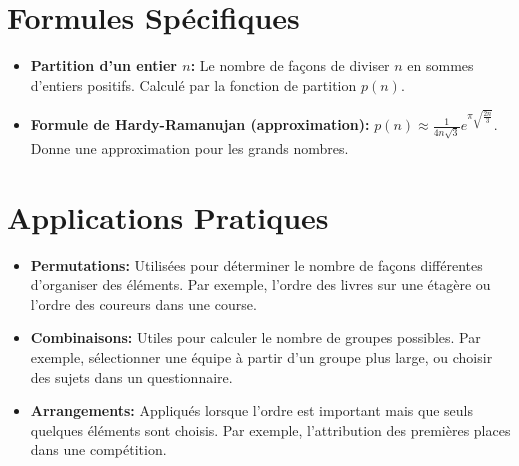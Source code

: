 \documentclass{article}
\begin{document}
\section{Formules Spécifiques}
\begin{itemize}
    \item \textbf{Partition d'un entier \(n\):} Le nombre de façons de diviser \(n\) en sommes d'entiers positifs. Calculé par la fonction de partition \(p(n)\).
    \item \textbf{Formule de Hardy-Ramanujan (approximation):} \(p(n) \approx \frac {1} {4n\sqrt{3}} e^{\pi \sqrt{\frac{2n}{3}}}\). Donne une approximation pour les grands nombres.
\end{itemize}

\section{Applications Pratiques}
\begin{itemize}
    \item \textbf{Permutations:} Utilisées pour déterminer le nombre de façons différentes d'organiser des éléments. Par exemple, l'ordre des livres sur une étagère ou l'ordre des coureurs dans une course.
    \item \textbf{Combinaisons:} Utiles pour calculer le nombre de groupes possibles. Par exemple, sélectionner une équipe à partir d'un groupe plus large, ou choisir des sujets dans un questionnaire.
    \item \textbf{Arrangements:} Appliqués lorsque l'ordre est important mais que seuls quelques éléments sont choisis. Par exemple, l'attribution des premières places dans une compétition.
\end{itemize}
\end{document}
